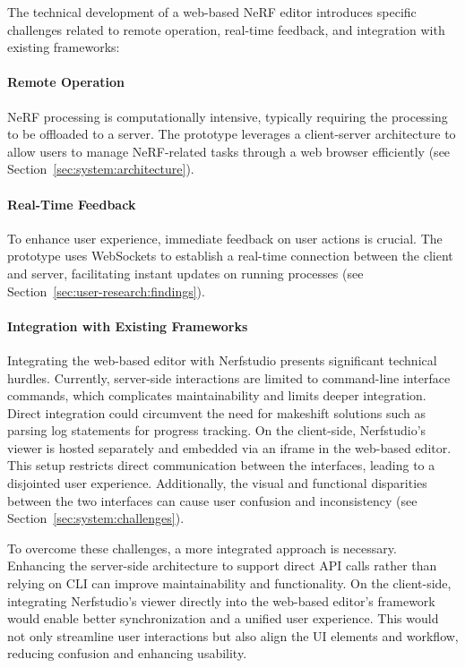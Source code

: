 The technical development of a web-based NeRF editor introduces specific challenges related to remote operation, real-time feedback, and integration with existing frameworks:

\paragraph{Remote Operation} NeRF processing is computationally intensive, typically requiring the processing to be offloaded to a server.
The prototype leverages a client-server architecture to allow users to manage NeRF-related tasks through a web browser efficiently (see Section~\ref{sec:system:architecture}).
    
\paragraph{Real-Time Feedback} To enhance user experience, immediate feedback on user actions is crucial.
The prototype uses WebSockets to establish a real-time connection between the client and server, facilitating instant updates on running processes (see Section~\ref{sec:user-research:findings}).
    
\paragraph{Integration with Existing Frameworks} Integrating the web-based editor with Nerfstudio presents significant technical hurdles.
Currently, server-side interactions are limited to command-line interface commands, which complicates maintainability and limits deeper integration.
Direct integration could circumvent the need for makeshift solutions such as parsing log statements for progress tracking.
On the client-side, Nerfstudio's viewer is hosted separately and embedded via an iframe in the web-based editor.
This setup restricts direct communication between the interfaces, leading to a disjointed user experience.
Additionally, the visual and functional disparities between the two interfaces can cause user confusion and inconsistency (see Section~\ref{sec:system:challenges}).

To overcome these challenges, a more integrated approach is necessary.
Enhancing the server-side architecture to support direct API calls rather than relying on CLI can improve maintainability and functionality.
On the client-side, integrating Nerfstudio's viewer directly into the web-based editor's framework would enable better synchronization and a unified user experience.
This would not only streamline user interactions but also align the UI elements and workflow, reducing confusion and enhancing usability.



